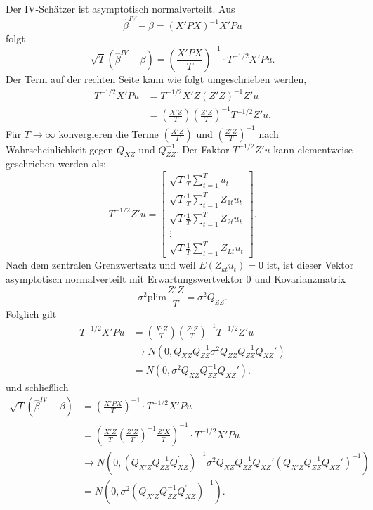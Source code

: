 \documentclass{article}
\begin{document}
Der IV-Schätzer ist asymptotisch normalverteilt. Aus
\[ \hat\beta^{IV}-\beta =(X'PX)^{-1}X'Pu \]
folgt
\[ \sqrt{T}(\hat\beta^{IV}-\beta) =\left( \frac{X'PX}{T}\right) ^{-1}\cdot T^{-1/2}X'Pu. \]
Der Term auf der rechten Seite kann wie folgt umgeschrieben werden,
\begin{align*}
T^{-1/2}X'Pu &= T^{-1/2}X'Z(Z'Z)^{-1}Z'u \\
&= \left( \frac{X'Z}{T}\right) \left( \frac{Z'Z}{T}\right)^{-1}T^{-1/2}Z'u.
\end{align*}
Für $T\rightarrow \infty $ konvergieren die Terme $\left(\frac{X'Z}{T}\right)$
und $\left( \frac{Z'Z}{T}\right)^{-1}$ nach Wahrscheinlichkeit gegen $Q_{XZ}$ und 
$Q_{ZZ}^{-1}$. Der Faktor $T^{-1/2}Z'u$ kann elementweise geschrieben werden als:
\[ T^{-1/2}Z'u=\left[ 
\begin{array}{c}
\sqrt{T}\frac{1}{T}\sum_{t=1}^{T}u_{t} \\ 
\sqrt{T}\frac{1}{T}\sum_{t=1}^{T}Z_{1t}u_{t} \\ 
\sqrt{T}\frac{1}{T}\sum_{t=1}^{T}Z_{2t}u_{t} \\ 
\vdots \\ 
\sqrt{T}\frac{1}{T}\sum_{t=1}^{T}Z_{Lt}u_{t}
\end{array}
\right] . \]
Nach dem zentralen Grenzwertsatz und weil $E(Z_{kt}u_{t})=0$ ist,
ist dieser Vektor asymptotisch normalverteilt mit Erwartungswertvektor 0 und
Kovarianzmatrix
\[ \sigma ^{2}\textrm{plim}\frac{Z'Z}{T}=\sigma ^{2}Q_{ZZ}. \]
Folglich gilt
\begin{align*}
T^{-1/2}X'Pu &= \left( \frac{X'Z}{T}\right) \left( \frac{Z'Z}{T}\right) ^{-1}T^{-1/2}Z'u \\
&\rightarrow N\left( 0,Q_{XZ}Q_{ZZ}^{-1}\sigma ^{2}Q_{ZZ}Q_{ZZ}^{-1}Q_{XZ}'\right) \\
&= N\left( 0,\sigma ^{2}Q_{XZ}Q_{ZZ}^{-1}Q_{XZ}'\right) .
\end{align*}
und schließlich
\begin{align*}
\sqrt{T}(\hat\beta^{IV}-\beta) 
&=\left( \frac{X'PX}{T}\right)^{-1}\cdot T^{-1/2}X'Pu \\
&=\left( \frac{X'Z}{T}\left( \frac{Z'Z}{T}\right) ^{-1}\frac{Z'X}{T}\right) ^{-1}\cdot T^{-1/2}X'Pu \\
&\rightarrow N\left( 0,\left( Q_{X'Z}Q_{ZZ}^{-1}Q_{XZ}^{\prime}\right) ^{-1}
\sigma ^{2}Q_{XZ}Q_{ZZ}^{-1}Q_{XZ}'\left(Q_{X'Z}Q_{ZZ}^{-1}Q_{XZ}'\right) ^{-1}\right) \\
&= N\left( 0,\sigma ^{2}\left( Q_{X'Z}Q_{ZZ}^{-1}Q_{XZ}^{\prime}\right) ^{-1}\right) .
\end{align*}
\end{document}
